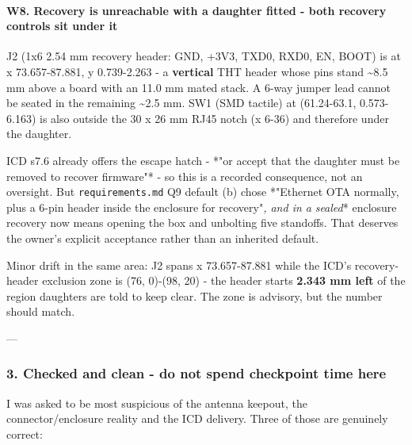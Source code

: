 \documentclass[11pt,a4paper]{article}
\begin{document}
\paragraph*{W8. Recovery is unreachable with a daughter fitted - both recovery controls sit under it}
J2 (1x6 2.54 mm recovery header: GND, +3V3, TXD0, RXD0, EN, BOOT) is at x 73.657-87.881, y 0.739-2.263 - a \textbf{vertical} THT header whose pins stand \textasciitilde{}8.5 mm above a board with an 11.0 mm mated stack. A 6-way jumper lead cannot be seated in the remaining \textasciitilde{}2.5 mm. SW1 (SMD tactile) at (61.24-63.1, 0.573-6.163) is also outside the 30 x 26 mm RJ45 notch (x 6-36) and therefore under the daughter.

ICD s7.6 already offers the escape hatch - {*}"or accept that the daughter must be removed to recover firmware"{*} - so this is a recorded consequence, not an oversight. But \texttt{requirements.md} Q9 default (b) chose {*}"Ethernet OTA normally, plus a 6-pin header inside the enclosure for recovery"\emph{, and in a }\emph{sealed}{*} enclosure recovery now means opening the box and unbolting five standoffs. That deserves the owner's explicit acceptance rather than an inherited default.

Minor drift in the same area: J2 spans x 73.657-87.881 while the ICD's recovery-header exclusion zone is (76, 0)-(98, 20) - the header starts \textbf{2.343 mm left} of the region daughters are told to keep clear. The zone is advisory, but the number should match.

---

\subsubsection*{3. Checked and clean - do not spend checkpoint time here}
I was asked to be most suspicious of the antenna keepout, the connector/enclosure reality and the ICD delivery. Three of those are genuinely correct:
\end{document}
